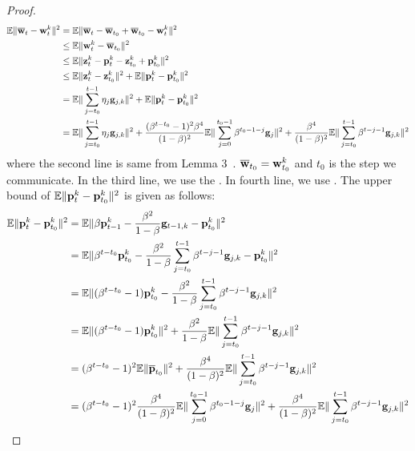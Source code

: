 \begin{proof}
\begin{align}
	\mathbb{E} \|{\overline{\mathbf{{\mathbf{w}}}}}_t -{\mathbf{w}}_t^k \|^2 & = \mathbb{E} \|{\overline{\mathbf{w}}}_t - {\overline{\mathbf{w}}}_{t_0} + {\overline{\mathbf{w}}}_{t_0}- {\mathbf{w}}_t^k \|^2\\
& \leq \mathbb{E}\|{\mathbf{w}}_t^k  - {\overline{\mathbf{w}}}_{t_0}\|^2  \\
& \leq \mathbb{E} \|{\mathbf{z}}_t^k - {\mathbf{p}}_t^k  - {\mathbf{z}}^k_{t_0} + {\mathbf{p}}^k_{t_0}\|^2  \\
& \leq \mathbb{E} \|{\mathbf{z}}_t^k - {\mathbf{z}}^k_{t_0}\|^2 + \mathbb{E}\|{\mathbf{p}}_t^k - {\mathbf{p}}^k_{t_0}\|^2  \\
& = \mathbb{E} \|\sum_{j=t_0}^{t-1}\eta_j {\mathbf{g}}_{j,k}\|^2 + \mathbb{E}\|{\mathbf{p}}_t^k - {\mathbf{p}}^k_{t_0}\|^2  \\
& = \mathbb{E} \|\sum_{j=t_0}^{t-1}\eta_j {\mathbf{g}}_{j,k}\|^2 + \frac{(\beta^{t-t_0}-1)^2\beta^4}{(1-\beta)^2}\mathbb{E}\|\sum_{j=0}^{t_0 - 1}\beta^{t_0-1-j}{\mathbf{g}}_j\|^2 + \frac{\beta^4}{(1 - \beta)^2} \mathbb{E}\|\sum_{j=t_0}^{t-1}\beta^{t-j-1}{\mathbf{g}}_{j,k}\|^2  \label{eq:nagcvx4-1}
\end{align}
where the second line is same from Lemma 3~\cite{li2019convergence}. ${\overline{\mathbf{w}}}_{t_0} = {\mathbf{w}}^k_{t_0}$ and $t_0$ is the step we communicate. In the third line, we use the \eq{\ref{eq:nasgdzt}}. In fourth line, we use \eq{\ref{eq:recursivep}}. 
The upper bound of $\mathbb{E}\|{\mathbf{p}}_t^k - {\mathbf{p}}^k_{t_0}\|^2$ is given as follows:
\begin{align}
	\mathbb{E}\|{\mathbf{p}}_t^k - {\mathbf{p}}^k_{t_0}\|^2 & = \mathbb{E}\|\beta {\mathbf{p}}^k_{t-1} - \frac{\beta^2}{1 - \beta} {\mathbf{g}}_{t-1,k} - {\mathbf{p}}^k_{t_0}\|^2\\
	&= \mathbb{E}\|\beta^{t-t_0} {\mathbf{p}}^k_{t_0} - \frac{\beta^2}{1 - \beta} \sum_{j=t_0}^{t-1}\beta^{t-j-1}{\mathbf{g}}_{j,k} - {\mathbf{p}}^k_{t_0}\|^2\\
	&= \mathbb{E}\|(\beta^{t-t_0}-1) {\mathbf{p}}^k_{t_0} - \frac{\beta^2}{1 - \beta} \sum_{j=t_0}^{t-1}\beta^{t-j-1}{\mathbf{g}}_{j,k}\|^2\\
	&= \mathbb{E}\|(\beta^{t-t_0}-1) {\mathbf{p}}^k_{t_0}\|^2 + \frac{\beta^2}{1 - \beta} \mathbb{E}\|\sum_{j=t_0}^{t-1}\beta^{t-j-1}{\mathbf{g}}_{j,k}\|^2\\
	&= (\beta^{t-t_0}-1)^2\mathbb{E}\|{\overline{\mathbf{p}}}_{t_0}\|^2 + \frac{\beta^4}{(1 - \beta)^2} \mathbb{E}\|\sum_{j=t_0}^{t-1}\beta^{t-j-1}{\mathbf{g}}_{j,k}\|^2\\
	&= (\beta^{t-t_0}-1)^2\frac{\beta^4}{(1-\beta)^2}\mathbb{E}\|\sum_{j=0}^{t_0 - 1}\beta^{t_0-1-j}{\mathbf{g}}_j\|^2 + \frac{\beta^4}{(1 - \beta)^2} \mathbb{E}\|\sum_{j=t_0}^{t-1}\beta^{t-j-1}{\mathbf{g}}_{j,k}\|^2 \label{eq:nagcvx5}
\end{align}


\end{proof}
